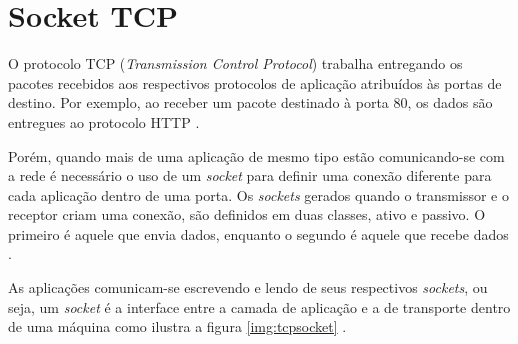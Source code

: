 \section{Socket TCP}
O protocolo TCP (\textit{Transmission Control Protocol}) trabalha entregando os pacotes recebidos aos respectivos protocolos de aplicação atribuídos às portas de destino. Por exemplo, ao receber um pacote destinado à porta 80, os dados são entregues ao protocolo HTTP \cite{torres2001completo}.

Porém, quando mais de uma aplicação de mesmo tipo estão comunicando-se com a rede é necessário o uso de um \textit{socket} para definir uma conexão diferente para cada aplicação dentro de uma porta. Os \textit{sockets} gerados quando o transmissor e o receptor criam uma conexão, são definidos em duas classes, ativo e passivo. O primeiro é aquele que envia dados, enquanto o segundo é aquele que recebe dados \cite{torres2001completo}.

As aplicações comunicam-se escrevendo e lendo de seus respectivos \textit{sockets}, ou seja, um \textit{socket} é a interface entre a camada de aplicação e a de transporte dentro de uma máquina como ilustra a figura \ref{img:tcpsocket} \cite{james2005redes}.

